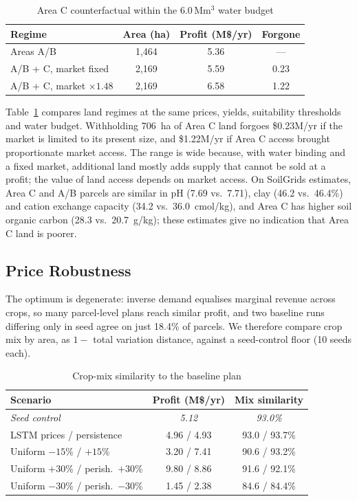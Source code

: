 \documentclass[conference,a4paper]{IEEEtran}
\begin{document}
\begin{table}[t]
\centering
\caption{Area C counterfactual within the 6.0\,Mm$^3$ water budget}
\label{tab:areac}
\footnotesize
\setlength{\tabcolsep}{4pt}
\begin{tabular}{lccc}
\toprule
Regime & Area (ha) & Profit (M\$/yr) & Forgone \\
\midrule
Areas A/B & 1{,}464 & 5.36 & --- \\
A/B + C, market fixed & 2{,}169 & 5.59 & 0.23 \\
A/B + C, market $\times1.48$ & 2{,}169 & 6.58 & 1.22 \\
\bottomrule
\end{tabular}
\end{table}

Table~\ref{tab:areac} compares land regimes at the same prices, yields,
suitability thresholds and water budget. Withholding 706~ha of Area C land
forgoes \$0.23M/yr if the market is limited to its present size, and
\$1.22M/yr if Area C access brought proportionate market access. The range is
wide because, with water binding and a fixed market, additional land mostly
adds supply that cannot be sold at a profit; the value of land access depends
on market access. On SoilGrids estimates, Area C and A/B parcels are similar in
pH (7.69 vs.\ 7.71), clay (46.2 vs.\ 46.4\%) and cation exchange capacity (34.2
vs.\ 36.0~cmol/kg), and Area C has higher soil organic carbon (28.3 vs.\
20.7~g/kg); these estimates give no indication that Area C land is poorer.

\subsection{Price Robustness}

The optimum is degenerate: inverse demand equalises marginal revenue across
crops, so many parcel-level plans reach similar profit, and two baseline runs
differing only in seed agree on just 18.4\% of parcels. We therefore compare
crop mix by area, as $1-$ total variation distance, against a seed-control
floor (10 seeds each).

\begin{table}[t]
\centering
\caption{Crop-mix similarity to the baseline plan}
\label{tab:robust}
\footnotesize
\begin{tabular}{lcc}
\toprule
Scenario & Profit (M\$/yr) & Mix similarity \\
\midrule
\emph{Seed control} & \emph{5.12} & \emph{93.0\%} \\
LSTM prices / persistence & 4.96 / 4.93 & 93.0 / 93.7\% \\
Uniform $-15\%$ / $+15\%$ & 3.20 / 7.41 & 90.6 / 93.2\% \\
Uniform $+30\%$ / perish.\ $+30\%$ & 9.80 / 8.86 & 91.6 / 92.1\% \\
Uniform $-30\%$ / perish.\ $-30\%$ & 1.45 / 2.38 & 84.6 / 84.4\% \\
\bottomrule
\end{tabular}
\end{table}
\end{document}
